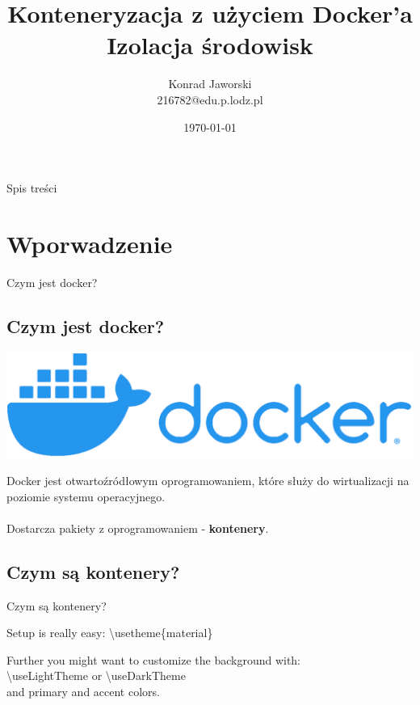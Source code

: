 \documentclass[aspectratio=169]{beamer}
\title{Konteneryzacja z użyciem \textbf{Docker}'a \\Izolacja środowisk}
\date{\today}
\author[Jaworski]{Konrad Jaworski\\216782@edu.p.lodz.pl}
\begin{document}
\begin{frame}
    \titlepage
\end{frame}

\begin{frame}{Spis treści}
    \begin{card}
        \tableofcontents
    \end{card}
\end{frame}

\section{Wporwadzenie}
\begin{frame}{Czym jest docker?}\subsection{Czym jest docker?}

    \centering
    \includegraphics[scale=0.2]{img/logo.png}
    \bigskip

    \begin{card}
        Docker jest otwartoźródłowym oprogramowaniem, które służy do wirtualizacji na poziomie systemu operacyjnego.\\\\
        Dostarcza pakiety z oprogramowaniem - \textbf{kontenery}.
    \end{card}
\end{frame}




\subsection{Czym są kontenery?}
\begin{frame}{Czym są kontenery?}
    \begin{card}
        Setup is really easy:
        {\color{primary}\textbackslash usetheme\{material\}}
    \end{card}
    \begin{card}
        Further you might want to customize the background with: \\[2mm]
        {\color{primary}\textbackslash useLightTheme} or {\color{primary}\textbackslash useDarkTheme} \\[2mm]
        and primary and accent colors.
    \end{card}
\end{frame}
\end{document}
